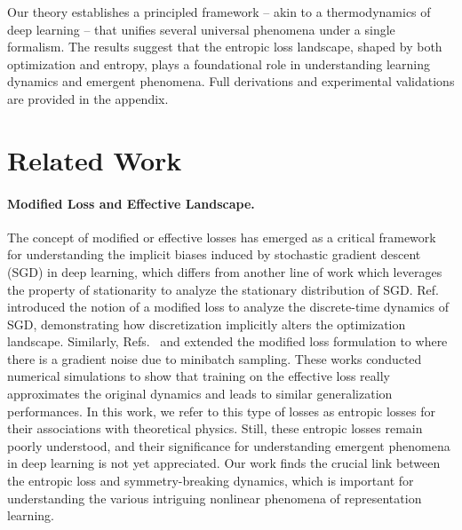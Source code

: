 \documentclass{article}
\theoremstyle{plain}
\begin{document}
Our theory establishes a principled framework -- akin to a thermodynamics of deep learning -- that unifies several universal phenomena under a single formalism. The results suggest that the entropic loss landscape, shaped by both optimization and entropy, plays a foundational role in understanding learning dynamics and emergent phenomena. Full derivations and experimental validations are provided in the appendix.


\vspace{-2mm}
\section{Related Work}
\vspace{-1mm}
\paragraph{Modified Loss and Effective Landscape.}
The concept of modified or effective losses has emerged as a critical framework for understanding the implicit biases induced by stochastic gradient descent (SGD) in deep learning, which differs from another line of work \citep{yaida2018fluctuation,zhang2019algorithmic,ziyin2022strength,liu2021noise,ziyin2025noise} which leverages the property of stationarity to analyze the stationary distribution of SGD. Ref.~\citep{barrett2020implicit} introduced the notion of a modified loss to analyze the discrete-time dynamics of SGD, demonstrating how discretization implicitly alters the optimization landscape. Similarly,  Refs.~\citep{smith2021origin} and \cite{dandi2022implicit} extended the modified loss formulation to where there is a gradient noise due to minibatch sampling. These works conducted numerical simulations to show that training on the effective loss really approximates the original dynamics \cite{smith2021origin, geiping2021stochastic,kunin2023limiting} and leads to similar generalization performances. In this work, we refer to this type of losses as entropic losses for their associations with theoretical physics. Still, these entropic losses remain poorly understood, and their significance for understanding emergent phenomena in deep learning is not yet appreciated. Our work finds the crucial link between the entropic loss and symmetry-breaking dynamics, which is important for understanding the various intriguing nonlinear phenomena of representation learning. 

\vspace{-2mm}
\end{document}
